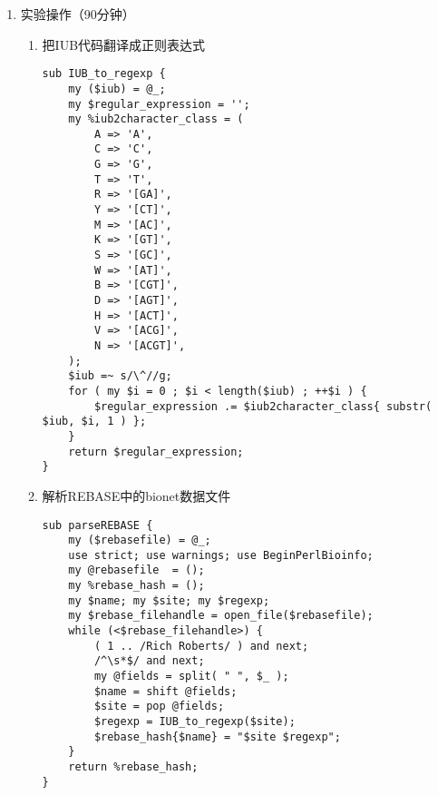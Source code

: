 \documentclass{TIJMUjiaoanSY}
\begin{document}
\firstTail

\newpage
\otherHeader

\begin{enumerate}
  \item 实验操作（90分钟）
    \begin{enumerate}
      \item 把IUB代码翻译成正则表达式
\begin{verbatim}
sub IUB_to_regexp {
    my ($iub) = @_;
    my $regular_expression = '';
    my %iub2character_class = (
        A => 'A',
        C => 'C',
        G => 'G',
        T => 'T',
        R => '[GA]',
        Y => '[CT]',
        M => '[AC]',
        K => '[GT]',
        S => '[GC]',
        W => '[AT]',
        B => '[CGT]',
        D => '[AGT]',
        H => '[ACT]',
        V => '[ACG]',
        N => '[ACGT]',
    );
    $iub =~ s/\^//g;
    for ( my $i = 0 ; $i < length($iub) ; ++$i ) {
        $regular_expression .= $iub2character_class{ substr( $iub, $i, 1 ) };
    }
    return $regular_expression;
}
\end{verbatim}
      \item 解析REBASE中的bionet数据文件
\begin{verbatim}
sub parseREBASE {
    my ($rebasefile) = @_;
    use strict; use warnings; use BeginPerlBioinfo;
    my @rebasefile  = ();
    my %rebase_hash = ();
    my $name; my $site; my $regexp;
    my $rebase_filehandle = open_file($rebasefile);
    while (<$rebase_filehandle>) {
        ( 1 .. /Rich Roberts/ ) and next;
        /^\s*$/ and next;
        my @fields = split( " ", $_ );
        $name = shift @fields;
        $site = pop @fields;
        $regexp = IUB_to_regexp($site);
        $rebase_hash{$name} = "$site $regexp";
    }
    return %rebase_hash;
}
\end{verbatim}

\otherTail
\newpage
\otherHeader


\end{enumerate}
\end{enumerate}
\end{document}
